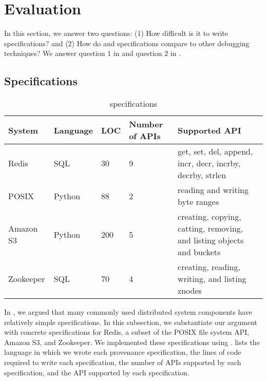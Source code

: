 \section{Evaluation}

In this section, we answer two questions: (1) How difficult is it to write
\watprovenance{} specifications? and (2) How do \watprovenance{} and
\watprovenance{} specifications compare to other debugging techniques?
We answer question $1$ in  and question $2$ in
.

\subsection{\WatProvenance{} Specifications}
\begin{table*}[t]
  \caption{\fluent{} \watprovenance{} specifications}
  \begin{tabular}{lllll}
    \toprule
    System    & Language & LOC & Number of APIs & Supported API                                                         \\\midrule
    Redis     & SQL      & 30  & 9              & get, set, del, append, incr, decr, incrby, decrby, strlen             \\
    POSIX     & Python   & 88  & 2              & reading and writing byte ranges                                       \\
    Amazon S3 & Python   & 200 & 5              & creating, copying, catting, removing, and listing objects and buckets \\
    Zookeeper & SQL      & 70  & 4              & creating, reading, writing, and listing znodes                        \\
    \bottomrule
  \end{tabular}
\end{table*}

In , we argued that many commonly used distributed system
components have relatively simple \watprovenance{} specifications. In this
subsection, we substantiate our argument with concrete \watprovenance{}
specifications for Redis, a subset of the POSIX file system API, Amazon S3, and
Zookeeper.
%
We implemented these \watprovenance{} specifications using \fluent{}.
 lists the language in which we wrote each provenance
specification, the lines of code required to write each specification, the
number of APIs supported by each specification, and the API supported by each
specification.

